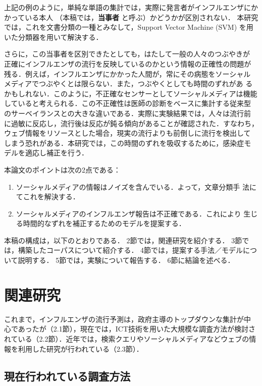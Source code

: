 \documentclass[japanese]{jnlp_1.4}
\begin{document}
上記の例のように，単純な単語の集計では，実際に発言者がインフルエンザにかかっている本人
（本稿では，{\bf 当事者} と呼ぶ）かどうかが区別されない．
本研究では，これを文書分類の一種とみなして，Support Vector Machine
(SVM) \cite{Vapnik1999}を用いた分類器を用いて解決する．

さらに，この当事者を区別できたとしても，はたして一般の人々のつぶやきが
正確にインフルエンザの流行を反映しているのかという情報の正確性の問題が
残る．例えば，インフルエンザにかかった人間が，常にその病態をソーシャル
メディアでつぶやくとは限らない．また，つぶやくとしても時間のずれがあ
るかもしれない．このように，不正確なセンサーとしてソーシャルメディアは機能
していると考えられる．この不正確性は医師の診断をベースに集計する従来型
のサーベイランスとの大きな違いである．実際に実験結果では，人々は流行前
に過敏に反応し，流行後は反応が鈍る傾向があることが確認された．すなわち，
ウェブ情報をリソースとした場合，現実の流行よりも前倒しに流行を検出して
しまう恐れがある．本研究では，この時間のずれを吸収するために，感染症モ
デル\cite{Kermack1927}を適応し補正を行う．

本論文のポイントは次の2点である：
\begin{enumerate}
\item ソーシャルメディアの情報はノイズを含んでいる．よって，文章分類手
  法にてこれを解決する．
\item ソーシャルメディアのインフルエンザ報告は不正確である．これにより
  生じる時間的なずれを補正するためのモデルを提案する．
\end{enumerate}



本稿の構成は，以下のとおりである．
2節では，関連研究を紹介する．
3節では，構築したコーパスについて紹介する．
4節では，提案する手法／モデルについて説明する．
5節では，実験について報告する．
6節に結論を述べる．



\section{関連研究}

これまで，インフルエンザの流行予測は，政府主導のトップダウンな集計が中
心であったが（2.1節），現在では，ICT技術を用いた大規模な調査方法が検討さ
れている（2.2節）．近年では，検索クエリやソーシャルメディアなどウェブの情
報を利用した研究が行われている（2.3節）．


\subsection{現在行われている調査方法}
\end{document}
